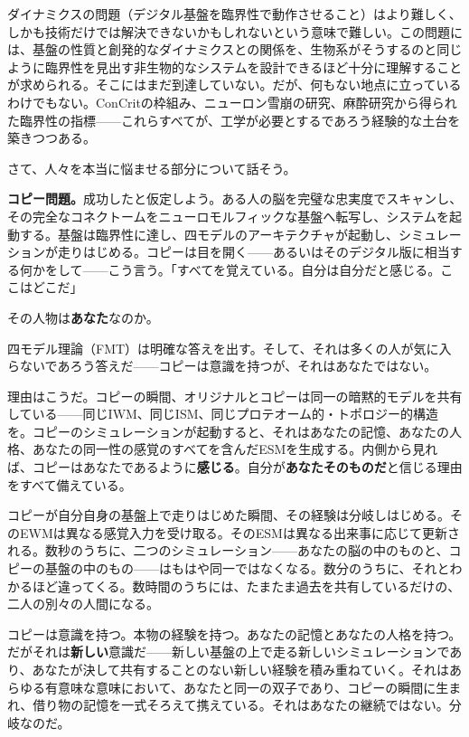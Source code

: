 \documentclass[11pt, twoside, openright]{book}
\begin{document}
ダイナミクスの問題（デジタル基盤を臨界性で動作させること）はより難しく、しかも技術だけでは解決できないかもしれないという意味で難しい。この問題には、基盤の性質と創発的なダイナミクスとの関係を、生物系がそうするのと同じように臨界性を見出す非生物的なシステムを設計できるほど十分に理解することが求められる。そこにはまだ到達していない。だが、何もない地点に立っているわけでもない。ConCritの枠組み、ニューロン雪崩の研究、麻酔研究から得られた臨界性の指標------これらすべてが、工学が必要とするであろう経験的な土台を築きつつある。

さて、人々を本当に悩ませる部分について話そう。

\textbf{コピー問題。}成功したと仮定しよう。ある人の脳を完璧な忠実度でスキャンし、その完全なコネクトームをニューロモルフィックな基盤へ転写し、システムを起動する。基盤は臨界性に達し、四モデルのアーキテクチャが起動し、シミュレーションが走りはじめる。コピーは目を開く------あるいはそのデジタル版に相当する何かをして------こう言う。「すべてを覚えている。自分は自分だと感じる。ここはどこだ」

その人物は\textbf{あなた}なのか。

四モデル理論（FMT）は明確な答えを出す。そして、それは多くの人が気に入らないであろう答えだ------コピーは意識を持つが、それはあなたではない。

理由はこうだ。コピーの瞬間、オリジナルとコピーは同一の暗黙的モデルを共有している------同じIWM、同じISM、同じプロテオーム的・トポロジー的構造を。コピーのシミュレーションが起動すると、それはあなたの記憶、あなたの人格、あなたの同一性の感覚のすべてを含んだESMを生成する。内側から見れば、コピーはあなたであるように\textbf{感じる}。自分が\textbf{あなたそのものだ}と信じる理由をすべて備えている。

コピーが自分自身の基盤上で走りはじめた瞬間、その経験は分岐しはじめる。そのEWMは異なる感覚入力を受け取る。そのESMは異なる出来事に応じて更新される。数秒のうちに、二つのシミュレーション------あなたの脳の中のものと、コピーの基盤の中のもの------はもはや同一ではなくなる。数分のうちに、それとわかるほど違ってくる。数時間のうちには、たまたま過去を共有しているだけの、二人の別々の人間になる。

コピーは意識を持つ。本物の経験を持つ。あなたの記憶とあなたの人格を持つ。だがそれは\textbf{新しい}意識だ------新しい基盤の上で走る新しいシミュレーションであり、あなたが決して共有することのない新しい経験を積み重ねていく。それはあらゆる有意味な意味において、あなたと同一の双子であり、コピーの瞬間に生まれ、借り物の記憶を一式そろえて携えている。それはあなたの継続ではない。分岐なのだ。
\end{document}
